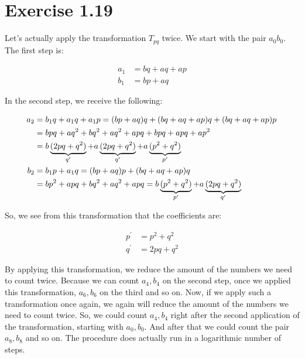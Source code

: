 \section*{Exercise 1.19}

Let's actually apply the transformation $T_{pq}$ twice. We start with the pair $a_0 b_0$. The first step is:

\begin{align*}
a_1 &= bq + aq + ap \\
b_1 &= bp + aq
\end{align*}

In the second step, we receive the following:

\begin{align*}
\mathllap{a_2} &= b_1 q + a_1 q + a_1 p = (bp + aq) q + (bq + aq + ap) q + (bq + aq + ap) p\\
&= bpq + aq^2 + bq^2 + aq^2 + apq + bpq + apq + ap^2\\
&= b \underbrace{(2pq + q^2)}_{q^\prime} + a \underbrace{(2pq + q^2)}_{q^\prime} + a \underbrace{(p^2 + q^2)}_{p^\prime}\\
b_2 &= b_1 p + a_1 q = (bp + aq)p + (bq + aq + ap)q\\
&= bp^2 + apq + bq^2 + aq^2 + apq = b\underbrace{(p^2 + q^2)}_{p^\prime} + a\underbrace{(2pq+q^2)}_{q^\prime}
\end{align*}

So, we see from this transformation that the coefficients are:

\begin{align*}
p^\prime &= p^2 + q^2\\
q^\prime &= 2pq + q^2
\end{align*}

By applying this transformation, we reduce the amount of the numbers we need to count twice. Because we can count $a_4, b_4$ on the second step, once we applied this transformation, $a_6, b_6$ on the third and so on. Now, if we apply such a transformation once again, we again will reduce the amount of the numbers we need to count twice. So, we could count $a_4, b_4$ right after the second application of the transformation, starting with $a_0, b_0$. And after that we could count the pair $a_8, b_8$ and so on. The procedure does actually run in a logarithmic number of steps.

